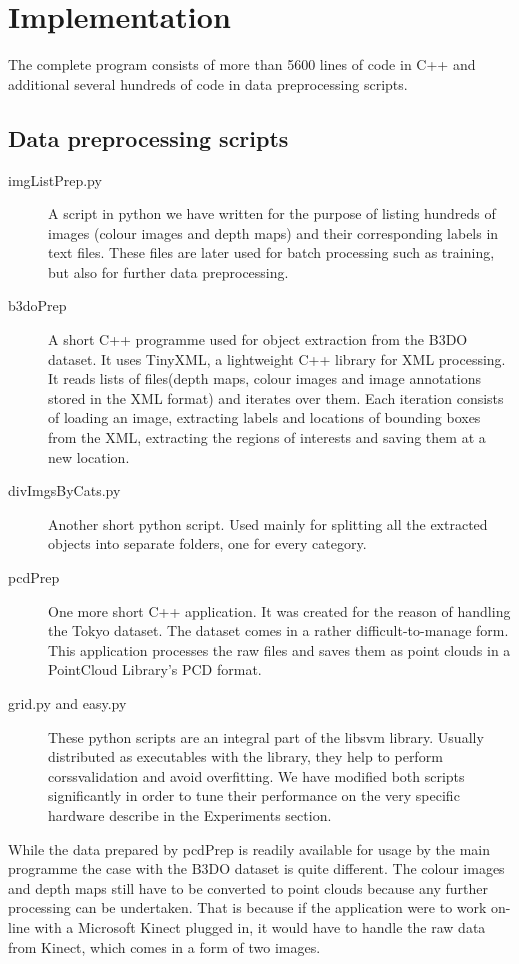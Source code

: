 \section{Implementation}

	The complete program consists of more than 5600 lines of code in C++ and additional several hundreds of code in data preprocessing scripts.
	
	\subsection{Data preprocessing scripts}
		\begin{description}
			\item[imgListPrep.py] A script in python we have written for the purpose of listing hundreds of images (colour images and depth maps) and their corresponding labels in text files. These files are later used for batch processing such as training, but also for further data preprocessing.
			\item[b3doPrep] A short C++ programme used for object extraction from the B3DO dataset. It uses TinyXML, a lightweight C++ library for XML processing. It reads lists of files(depth maps, colour images and image annotations stored in the XML format) and iterates over them. Each iteration consists of loading an image, extracting labels and locations of bounding boxes from the XML, extracting the regions of interests and saving them at a new location.
			\item[divImgsByCats.py] Another short python script. Used mainly for splitting all the extracted objects into separate folders, one for every category.
			\item[pcdPrep] One more short C++ application. It was created for the reason of handling the Tokyo dataset. The dataset comes in a rather difficult-to-manage form. This application processes the raw files and saves them as point clouds in a PointCloud Library's PCD format.	 
			\item[grid.py and easy.py] These python scripts are an integral part of the libsvm library. Usually distributed as executables with the library, they help to perform corssvalidation and avoid overfitting. We have modified both scripts significantly in order to tune their performance on the very specific hardware describe in the Experiments section.
		\end{description}
		
		While the data prepared by pcdPrep is readily available for usage by the main programme the case with the B3DO dataset is quite different. The colour images and depth maps still have to be converted to point clouds because any further processing can be undertaken. That is because if the application were to work on-line with a Microsoft Kinect plugged in, it would have to handle the raw data from Kinect, which comes in a form of two images.

